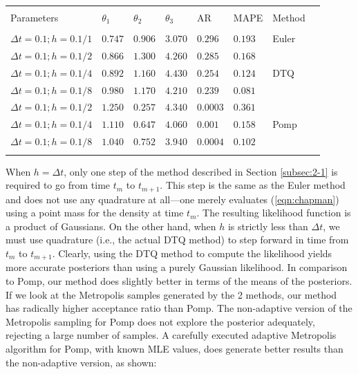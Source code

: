 \documentclass[graybox]{svmult}
\begin{document}
\setlength{\tabcolsep}{10pt}
\begin{table}[] \centering 
\begin{tabular}{llllllll} 
\\[-1.8ex]\hline 
\hline \\[-1.8ex] 
Parameters & $\theta_1$ & $\theta_2$ & $\theta_3$ & AR & MAPE & Method \\ 
\hline \\[-1.8ex] 
$\Delta t = 0.1; h = 0.1/1$ & $0.747$ & $0.906$ & $3.070$ & $0.296$ & $0.193$ & Euler \\ \hline
$\Delta t = 0.1; h = 0.1/2$ & $0.866$ & $1.300$ & $4.260$ & $0.285$ & $0.168$ &  \\ 
$\Delta t = 0.1; h = 0.1/4$ & $0.892$ & $1.160$ & $4.430$ & $0.254$ & $0.124$ & DTQ \\ 
$\Delta t = 0.1; h = 0.1/8$ & $0.980$ & $1.170$ & $4.210$ & $0.239$ & $0.081$ &  \\ \hline
$\Delta t = 0.1; h = 0.1/2$ & $1.250$ & $0.257$ & $4.340$ & $0.0003$ & $0.361$ &  \\ 
$\Delta t = 0.1; h = 0.1/4$ & $1.110$ & $0.647$ & $4.060$ & $0.001$ & $0.158$ & Pomp \\ 
$\Delta t = 0.1; h = 0.1/8$ & $1.040$ & $0.752$ & $3.940$ & $0.0004$ & $0.102$ &  \\ 
\hline \\[-1.8ex] 
\end{tabular} 
\end{table} 
\vspace{-5mm}
When $h = \Delta t$, only one step of the method described in Section
\ref{subsec:2-1} is required to go from time $t_m$ to $t_{m+1}$. This
step is the same as the Euler method and does not use any quadrature at all---one merely evaluates (\ref{eqn:chapman}) using a point mass for the density at time $t_m$. The resulting likelihood function is a product of Gaussians. On the other hand, when $h$ is strictly less than $\Delta t$, we must use quadrature (i.e., the actual DTQ method) to step forward in time from $t_m$ to $t_{m+1}$. Clearly, using the DTQ method to compute the likelihood yields more accurate posteriors than using a purely Gaussian likelihood. In comparison to Pomp, our method does slightly better in terms of the means of the posteriors. If we look at the Metropolis samples generated by the 2 methods, our method has radically higher acceptance ratio than Pomp. The non-adaptive version of the Metropolis sampling for Pomp does not explore the posterior adequately, rejecting a large number of samples. A carefully executed adaptive Metropolis algorithm for Pomp, with known MLE values, does generate better results than the non-adaptive version, as shown:
\end{document}
